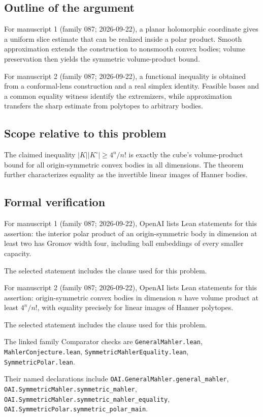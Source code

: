 \documentclass[11pt]{article}
\begin{document}
\subsection{Outline of the argument}
For manuscript 1 (family 087; 2026-09-22), a planar holomorphic coordinate gives a uniform slice estimate that can be realized inside a polar product. Smooth approximation extends the construction to nonsmooth convex bodies; volume preservation then yields the symmetric volume-product bound.

For manuscript 2 (family 087; 2026-09-22), a functional inequality is obtained from a conformal-lens construction and a real simplex identity. Feasible bases and a common equality witness identify the extremizers, while approximation transfers the sharp estimate from polytopes to arbitrary bodies.

\subsection{Scope relative to this problem}
The claimed inequality $|K||K^\circ|\ge4^n/n!$ is exactly the cube's volume-product bound for all origin-symmetric convex bodies in all dimensions. The theorem further characterizes equality as the invertible linear images of Hanner bodies.

\subsection{Formal verification}
For manuscript 1 (family 087; 2026-09-22), OpenAI lists Lean statements for this assertion: the interior polar product of an origin-symmetric body in dimension at least two has Gromov width four, including ball embeddings of every smaller capacity.

The selected statement includes the clause used for this problem.

For manuscript 2 (family 087; 2026-09-22), OpenAI lists Lean statements for this assertion: origin-symmetric convex bodies in dimension $n$ have volume product at least $4^n/n!$, with equality precisely for linear images of Hanner polytopes.

The selected statement includes the clause used for this problem.

The linked family Comparator checks are \texttt{GeneralMahler.lean}, \texttt{MahlerConjecture.lean}, \texttt{SymmetricMahlerEquality.lean}, \texttt{SymmetricPolar.lean}.

Their named declarations include \texttt{OAI.GeneralMahler.general\_mahler}, \texttt{OAI.SymmetricMahler.symmetric\_mahler}, \texttt{OAI.SymmetricMahler.symmetric\_mahler\_equality}, \texttt{OAI.SymmetricPolar.symmetric\_polar\_main}.
\end{document}
